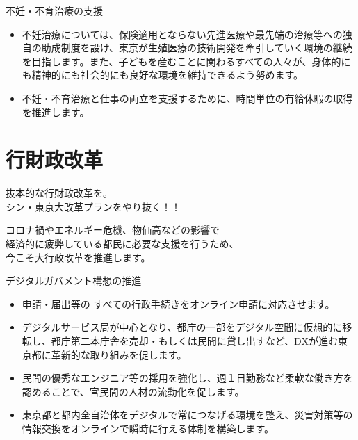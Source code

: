 \documentclass[dvipdfmx]{beamer}
\begin{document}
    \begin{frame}{不妊・不育治療の支援}{}
        \begin{small}
            \begin{itemize}
                \setlength{\itemsep}{2mm}
                \item 不妊治療については、保険適用とならない先進医療や最先端の治療等への独自の助成制度を設け、東京が生殖医療の技術開発を牽引していく環境の継続を目指します。また、子どもを産むことに関わるすべての人々が、身体的にも精神的にも社会的にも良好な環境を維持できるよう努めます。
                \item 不妊・不育治療と仕事の両立を支援するために、時間単位の有給休暇の取得を推進します。
            \end{itemize}
        \end{small}
    \end{frame}

\section{行財政改革}
    \begin{frame}
        \sectionpage
        \begin{center}
            \begin{large}
                \alert{抜本的な行財政改革を。}\\\alert{シン・東京大改革プランをやり抜く！！}
            \end{large}
        \end{center}
        \begin{small}
            コロナ禍やエネルギー危機、物価高などの影響で\\
            経済的に疲弊している都民に必要な支援を行うため、\\
            今こそ大行政改革を推進します。
        \end{small}
    \end{frame}

    \begin{frame}{デジタルガバメント構想の推進}{}
        \begin{small}
            \begin{itemize}
                \setlength{\itemsep}{2mm}
                \item 申請・届出等の すべての行政手続きをオンライン申請に対応させます。
                \item デジタルサービス局が中心となり、都庁の一部をデジタル空間に仮想的に移転し、都庁第二本庁舎を売却・もしくは民間に貸し出すなど、DXが進む東京都に革新的な取り組みを促します。
                \item 民間の優秀なエンジニア等の採用を強化し、週１日勤務など柔軟な働き方を認めることで、官民間の人材の流動化を促します。
                \item 東京都と都内全自治体をデジタルで常につなげる環境を整え、災害対策等の情報交換をオンラインで瞬時に行える体制を構築します。
            \end{itemize}
        \end{small}
    \end{frame}
\end{document}
